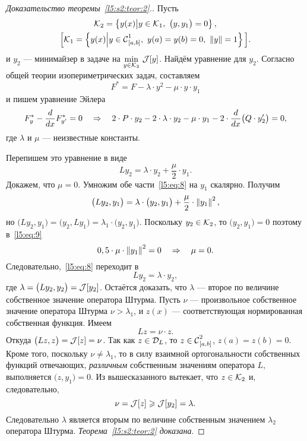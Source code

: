 \begin{proof}[Доказательство теоремы~\ref{l5:s2:teor:2}.] Пусть 
	\begin{multline*}
		\K_2=\left\{y(x)\middle|y\in\K_1,\ \big(y,y_1\big)=0\right\},\\\Big[\K_1=\left\{y(x)\middle|y\in\Cfn[{[a,b]}]{1},\ y(a)=y(b)=0,\ \norm{y}=1\right\}\Big].
	\end{multline*} 
	и $y_2$ --- минимайзер в задаче на $\min\limits_{y\in\K_2}\,\J[y]$. Найдём уравнение для $y_2$. Согласно общей теории изопериметрических задач, составляем 
	\begin{equation*}
		 F^{\ast}=F-\lambda\cdot y^2-\mu\cdot y\cdot y_1
	\end{equation*}
	и пишем уравнение Эйлера 
	\begin{equation*}
		 F^{\ast}_y-\der{}{x}F^{\ast}_{y'}=0\quad\Rightarrow\quad 2\cdot P\cdot y_2-2\cdot\lambda\cdot y_2-\mu\cdot y_1-2\cdot\der{}{x}\big(Q\cdot y'_2\big)=0,
	\end{equation*}
	где $\lambda$ и $\mu$ --- неизвестные константы. 
	
	Перепишем это уравнение в виде
	\begin{equation}
		\label{l5:eq:8}
		 Ly_2=\lambda\cdot y_2+\frac{\mu}2\cdot y_1.
	\end{equation}
	Докажем, что $\mu=0$. Умножим обе части~\eqref{l5:eq:8} на $y_1$ скалярно. Получим
	\begin{equation}
		\label{l5:eq:9}
		\big(Ly_2,y_1\big)=\lambda\cdot\big(y_2,y_1\big)+\frac{\mu}{2}\cdot \norm{y_1}^2,
	\end{equation} 
	но $\big(Ly_2,y_1\big)=\big(y_2,Ly_1\big)=\lambda_1\cdot\big(y_2,y_1\big)$. Поскольку $y_2\in\K_2$, то $\big(y_2,y_1\big)=0$ поэтому в~\eqref{l5:eq:9}
	\begin{equation*}
		 0,5\cdot\mu\cdot\norm{y_1}^2=0\quad\Rightarrow\quad\mu=0.
	\end{equation*}
	Следовательно{\mb,}~\eqref{l5:eq:8} переходит в 
	\begin{equation*}
		 Ly_2=\lambda\cdot y_2,
	\end{equation*}
	где $\lambda=\big(Ly_2,y_2\big)=\J[y_2]$. Остаётся доказать, что $\lambda$ --- второе по величине собственное значение оператора Штурма. Пусть $\nu$ --- произвольное собственное значение оператора Штурма $\nu>\lambda_1$, и $z(x)$ --- соответствующая нормированная собственная функция. Имеем 
	\begin{equation*}
		 Lz=\nu\cdot z.
	\end{equation*}
	Откуда $\big(Lz,z\big)=\J[z]=\nu$. Так как $z\in\mc{D}_{L}$, то $z\in\Cfn[{[a,b]}]{2}$, $z(a)=z(b)=0$. Кроме того, поскольку $\nu\neq\lambda_1$, то в силу взаимной ортогональности собственных функций отвечающих, \emph{различным} собственным значениям оператора $L$, выполняется $\big(z,y_1\big)=0$. Из вышесказанного вытекает, что $z\in\K_2$ и, следовательно,
	\begin{equation*}
		\nu=\J[z]\geqslant\J[y_2]=\lambda.
	\end{equation*} 
	Следовательно $\lambda$ является вторым по величине собственным значением $\lambda_2$ оператора Штурма. \emph{Теорема~\ref{l5:s2:teor:2} доказана}. 
\end{proof}
